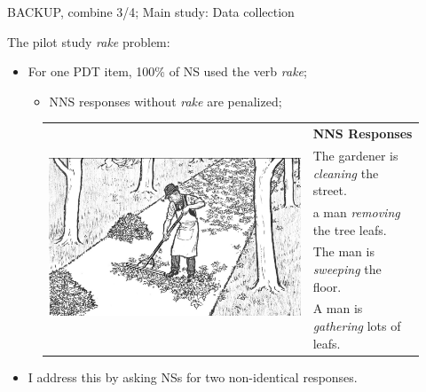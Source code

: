 \documentclass[handout,xcolor={dvipsnames}]{beamer}
\begin{document}
%


\begin{frame}{BACKUP, combine 3/4; Main study: Data collection}

\vspace{1em}
The pilot study \textit{rake} problem:

\begin{itemize}
\item For one PDT item, 100\% of NS used the verb \textit{rake};
\begin{itemize}
\item NNS responses without \textit{rake} are penalized;
\end{itemize}
\end{itemize}

\vspace{-1em}
\begin{figure}[htb!]
\begin{center}
\bgroup
\def\arraystretch{1.25}
\begin{tabular}{|C{35mm}|C{65mm}|}
\hline
{} &
\textbf{NNS Responses} \\
& The gardener is \textit{cleaning} the street. \\
& a man \textit{removing} the tree leafs. \\
& The man is \textit{sweeping} the floor. \\
& A man is \textit{gathering} lots of leafs. \\
\hline
\end{tabular}
\egroup
\end{center}
\label{fig:pilot-raking}
\end{figure}

\begin{itemize}
\item I address this by asking NSs for two non-identical responses.
\end{itemize}
\end{frame}
\end{document}
